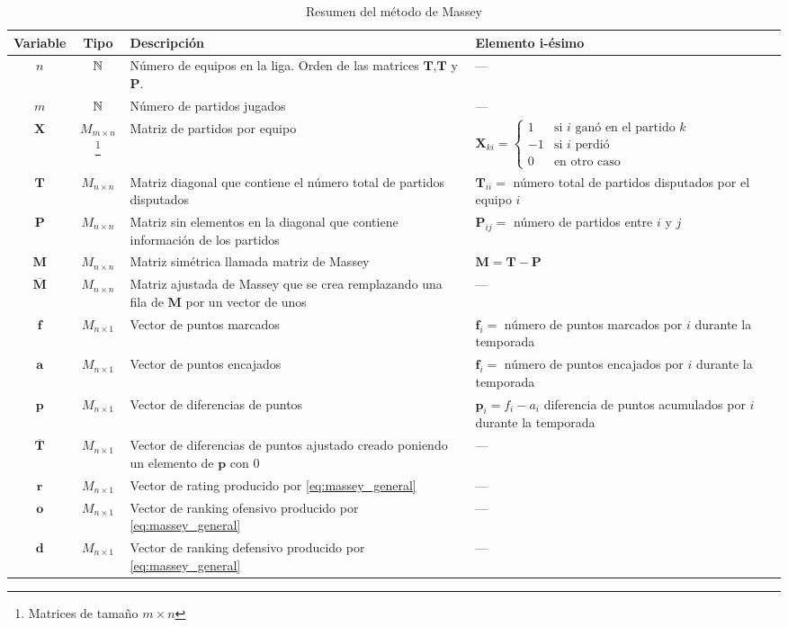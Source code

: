 \begin{longtable}{c c p{5cm} p{6cm}}
\caption{Resumen del método de Massey}\\
\toprule
Variable & Tipo & Descripción & Elemento i-ésimo\\
\hline
\endfirsthead

$n$ & $\mathbb{N}$ & Número de equipos en la liga. Orden de las matrices $\mathbf{T}$,$\mathbf{T}$ y $\mathbf{P}$. & ---\\
\hline
$m$ & $\mathbb{N}$ & Número de partidos jugados & ---\\
\hline
$\mathbf{X}$ & $M_{m\times n}$\footnote{Matrices de tamaño $m \times n$} & Matriz de partidos por equipo & $\mathbf{X}_{ki} = \begin{cases}
1 & \text{si } i \text{ ganó en el partido } k \\
 -1 & \text{si } i \text{ perdió} \\ 
0 & \text{en otro caso}
\end{cases}$ \\
\hline
$\mathbf{T}$ & $M_{n\times n}$ & Matriz diagonal que contiene el número total de partidos disputados & $\mathbf{T}_{ii} = $ número total de partidos disputados por el equipo $i$ \\
\hline
$\mathbf{P}$ & $M_{n\times n}$ & Matriz sin elementos en la diagonal que  contiene información de los partidos & $\mathbf{P}_{ij} = $ número de partidos entre $i$ y $j$ \\
\hline
$\mathbf{M}$ & $M_{n\times n}$ & Matriz simétrica llamada matriz de Massey & $\mathbf{M} = \mathbf{T}-\mathbf{P}$ \\
\hline 
$\overline{\mathbf{M}}$ & $M_{n \times n}$ & Matriz ajustada de Massey que se crea  remplazando una fila de $\mathbf{M}$ por un vector de unos & --- \\
\hline 
$\mathbf{f}$ & $M_{n\times 1}$ & Vector de puntos marcados & $\mathbf{f}_i = $ número de puntos  marcados por $i$ durante la temporada \\
\hline 
$\mathbf{a}$ & $M_{n\times 1}$ & Vector de puntos encajados & $\mathbf{f}_i = $ número de puntos encajados por $i$ durante la temporada \\
\hline 
$\mathbf{p}$ & $M_{n\times 1}$ & Vector de diferencias de puntos & $\mathbf{p}_i = f_i - a_i$ diferencia de puntos acumulados por $i$ durante la temporada \\
\hline 
$\overline{\mathbf{T}}$ & $M_{n\times 1}$ & Vector de diferencias de puntos ajustado creado poniendo un  elemento de $\mathbf{p}$ con $0$ & ---\\
\hline
$\mathbf{r}$ & $M_{n\times 1}$ & Vector de rating producido por 
\ref{eq:massey_general} & ---\\
\hline
$\mathbf{o}$ & $M_{n\times 1}$ & Vector de ranking ofensivo producido
por \ref{eq:massey_general} & ---\\
\hline 
$\mathbf{d}$ & $M_{n\times 1}$ & Vector de ranking defensivo producido por \ref{eq:massey_general} & ---\\


\end{longtable}
